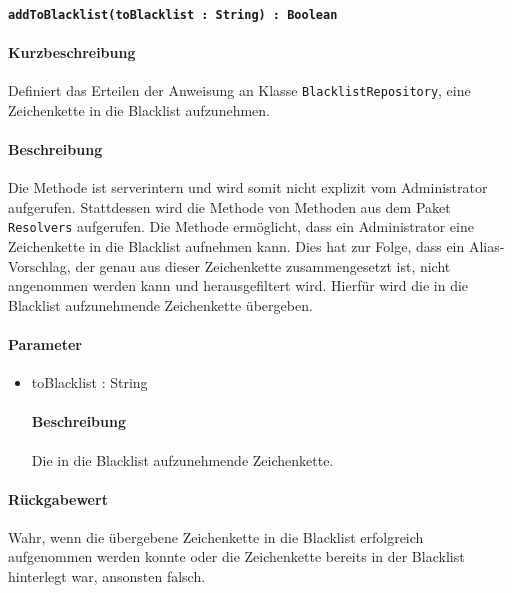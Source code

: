 \paragraph{\texttt{addToBlacklist(toBlacklist : String) : Boolean}}%
\paragraph*{Kurzbeschreibung}
Definiert das Erteilen der Anweisung an Klasse \texttt{BlacklistRepository}, eine Zeichenkette in die Blacklist aufzunehmen.
\paragraph*{Beschreibung}
Die Methode ist serverintern und wird somit nicht explizit vom Administrator aufgerufen.
Stattdessen wird die Methode von Methoden aus dem Paket \texttt{Resolvers} aufgerufen.
Die Methode ermöglicht, dass ein Administrator eine Zeichenkette in die Blacklist aufnehmen kann.
Dies hat zur Folge, dass ein Alias-Vorschlag, der genau aus dieser Zeichenkette zusammengesetzt ist, nicht angenommen werden kann und herausgefiltert wird.
Hierfür wird die in die Blacklist aufzunehmende Zeichenkette übergeben.
\paragraph*{Parameter}
\begin{itemize}
    \item toBlacklist : String
    		\paragraph*{Beschreibung}
    		Die in die Blacklist aufzunehmende Zeichenkette.
\end{itemize}
\paragraph*{Rückgabewert}
Wahr, wenn die übergebene Zeichenkette in die Blacklist erfolgreich aufgenommen werden konnte oder die Zeichenkette bereits in der Blacklist hinterlegt war, ansonsten falsch.
